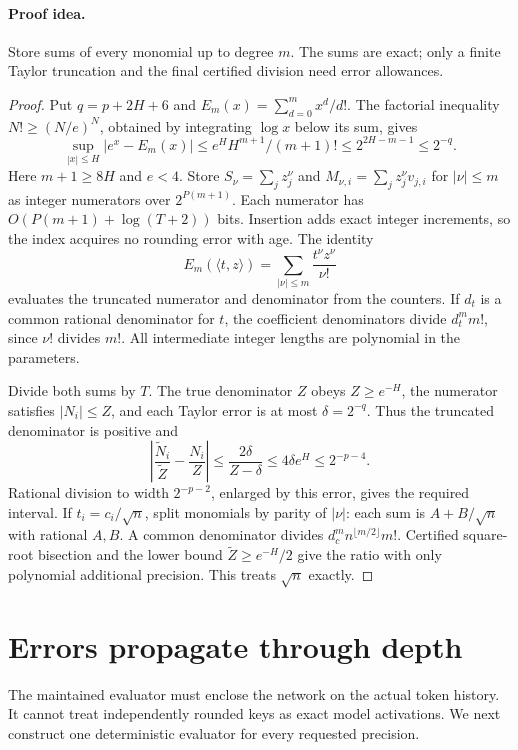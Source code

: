 \documentclass[11pt]{article}
\theoremstyle{definition}\newtheorem{definition}[theorem]{Definition}
\theoremstyle{remark}\newtheorem{remark}[theorem]{Remark}
\numberwithin{equation}{section}
\begin{document}
\paragraph{Proof idea.}
Store sums of every monomial up to degree $m$. The sums are exact;
only a finite Taylor truncation and the final certified division need
error allowances.
\begin{proof}
Put $q=p+2H+6$ and $E_m(x)=\sum_{d=0}^m x^d/d!$.
The factorial inequality $N!\ge(N/e)^N$, obtained by integrating
$\log x$ below its sum, gives
\[
 \sup_{|x|\le H}|e^x-E_m(x)|
 \le e^H H^{m+1}/(m+1)!\le2^{2H-m-1}\le2^{-q}.
\]
Here $m+1\ge8H$ and $e<4$. Store
$S_\nu=\sum_jz_j^\nu$ and $M_{\nu,i}=\sum_jz_j^\nu v_{j,i}$
for $|\nu|\le m$ as integer numerators over $2^{P(m+1)}$.
Each numerator has $O(P(m+1)+\log(T+2))$ bits. Insertion adds exact
integer increments, so the index acquires no rounding error with age.
The identity
\[
 E_m(\langle t,z\rangle)=\sum_{|\nu|\le m}\frac{t^\nu z^\nu}{\nu!}
\]
evaluates the truncated numerator and denominator from the counters.
If $d_t$ is a common rational denominator for $t$, the coefficient
denominators divide $d_t^m m!$, since $\nu!$ divides $m!$.
All intermediate integer lengths are polynomial in the parameters.

Divide both sums by $T$. The true denominator $Z$ obeys $Z\ge e^{-H}$,
the numerator satisfies $|N_i|\le Z$, and each Taylor error is at most
$\delta=2^{-q}$. Thus the truncated denominator is positive and
\[
 \left|\frac{\widetilde N_i}{\widetilde Z}-\frac{N_i}{Z}\right|
 \le\frac{2\delta}{Z-\delta}\le4\delta e^H\le2^{-p-4}.
\]
Rational division to width $2^{-p-2}$, enlarged by this error, gives
the required interval. If $t_i=c_i/\sqrt n$, split monomials by parity
of $|\nu|$: each sum is $A+B/\sqrt n$ with rational $A,B$.
A common denominator divides
$d_c^m n^{\lfloor m/2\rfloor}m!$. Certified square-root bisection and
the lower bound $\widetilde Z\ge e^{-H}/2$ give the ratio with only
polynomial additional precision. This treats $\sqrt n$ exactly.
\end{proof}

\section{Errors propagate through depth}
\label{sec:conf-stability}

The maintained evaluator must enclose the network on the actual token
history. It cannot treat independently rounded keys as exact model
activations. We next construct one deterministic evaluator for every
requested precision.
\end{document}
